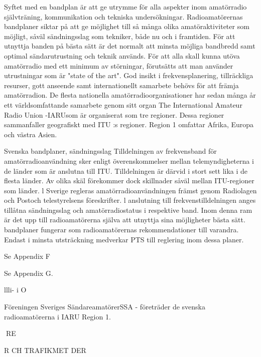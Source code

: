 Syftet med en bandplan är att ge utrymme för alla aspekter inom amatörradio självträning, kommunikation och tekniska
undersökningar.
Radioamatörernas bandplaner siktar på
att ge möjlighet till så många olika amatöraktiviteter som möjligt, såväl sändningsslag
som tekniker, både nu och i framtiden. För
att utnyttja banden på bästa sätt är det normalt att minsta möjliga bandbredd samt optimal sändarutrustning och teknik används.
För att alla skall kunna utöva amatörradio
med ett minimum av störningar, förutsätts att
man använder utrustningar som är "state of
the art".
God insikt i frekvensplanering, tillräckliga
resurser, gott anseende samt internationellt
samarbete behövs för att främja amatörradion. De flesta nationella amatörradioorganisationer har sedan många år ett världsomfattande samarbete genom sitt organ The
International Amateur Radio Union -IARUsom är organiserat som tre regioner. Dessa
regioner sammanfaller geografiskt med ITU :s
regioner. Region 1 omfattar Afrika, Europa
och västra Asien.

Svenska bandplaner, sändningsslag
Tilldelningen av frekvensband för amatörradioanvändning sker enligt överenskommelser mellan telemyndigheterna i de länder som är anslutna till ITU. Tilldelningen är
därvid i stort sett lika i de flesta länder. Av
olika skäl förekommer dock skillnader såväl
mellan ITU-regioner som länder.
l Sverige regleras amatörradioanvändningen främst genom Radiolagen och Postoch telestyrelsens föreskrifter. l anslutning
till frekvenstilldelningen anges tillåtna sändningsslag och amatörradiostatus i respektive band. Inom denna ram är det upp till
radioamatörerna själva att utnyttja sina möjligheter
bästa sätt.
bandplaner fungerar som radioamatörernas rekommendationer till varandra. Endast i minsta utsträckning medverkar
PTS till reglering inom dessa planer.

Se Appendix F

Se Appendix G.

llli- i O

Föreningen Sveriges SändareamatörerSSA - företräder de svenska radioamatörerna i IARU Region 1.

RE

R CH TRAFIKMET DER
